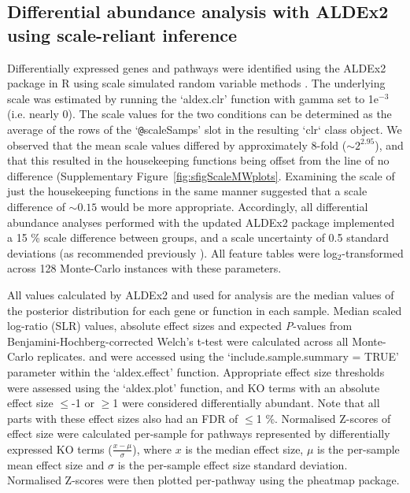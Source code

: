 \documentclass[sn-mathphys,Numbered]{sn-jnl}%
\begin{document}
\subsection{Differential abundance analysis with ALDEx2 using scale-reliant inference}
Differentially expressed genes and pathways were identified using the ALDEx2 package in R using scale simulated random variable methods \cite{fernandes:2013, gloorScale, nixon2023scale}. The underlying scale was estimated by running the `aldex.clr' function with gamma set to 1e$^{-3}$ (i.e. nearly 0). The scale values for the two conditions can be determined as the average of the rows of the `\texttt{@}scaleSamps' slot in the resulting `clr` class object. We observed that the mean scale values differed by approximately 8-fold ($\sim 2^{2.95}$), and that this resulted in the housekeeping functions being offset from the line of no difference (Supplementary Figure~\ref{fig:sfigScaleMWplots}. Examining the scale of just the housekeeping functions in the same manner suggested that a scale difference of $\sim0.15$ would be more appropriate. Accordingly, all differential abundance analyses performed with the updated ALDEx2 package implemented a 15 \% scale difference between groups, and a scale uncertainty of 0.5 standard deviations (as recommended previously \citep{gloorScale, nixon2023scale}). All feature tables were log$_2$-transformed across 128 Monte-Carlo instances with these parameters.

All values calculated by ALDEx2 and used for analysis are the median values of the posterior distribution for each gene or function in each sample. Median scaled log-ratio (SLR) values, absolute effect sizes and expected \textit{P}-values from Benjamini-Hochberg-corrected Welch's t-test were calculated across all Monte-Carlo replicates. and were accessed using the `include.sample.summary = TRUE' parameter within the `aldex.effect' function. Appropriate effect size thresholds were assessed using the `aldex.plot' function, and KO terms with an absolute effect size $\leq$-1 or $\geq$1 were considered differentially abundant. Note that all parts with these effect sizes also had an FDR of $\leq$1 \%. Normalised Z-scores of effect size were calculated per-sample for pathways represented by differentially expressed KO terms ($\frac{x-\mu}{\sigma}$), where $x$ is the median effect size, $\mu$ is the per-sample mean effect size and $\sigma$ is the per-sample effect size standard deviation. Normalised Z-scores were then plotted per-pathway using the pheatmap package.
\end{document}
